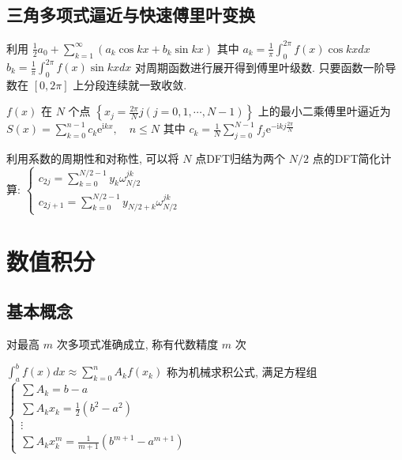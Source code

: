 \documentclass[10pt]{yerbaformat}
\begin{document}
\subsection{三角多项式逼近与快速傅里叶变换}
\par 利用 $\frac{1}{2} a_{0}+\sum_{k=1}^{\infty}\left(a_{k} \cos k x+b_{k} \sin k x\right)$ 其中 $a_{k}=\frac{1}{\pi} \int_{0}^{2 \pi} f(x) \cos k x d x$
$b_{k}=\frac{1}{\pi} \int_{0}^{2 \pi} f(x) \sin k x d x$ 对周期函数进行展开得到傅里叶级数. 只要函数一阶导数在 $[0,2\pi]$ 上分段连续就一致收敛.

\par $f(x)$ 在 $N$ 个点 $\left\{x_{j}=\frac{2 \pi}{N} j(j=0,1, \cdots, N-1)\right\}$ 上的最小二乘傅里叶逼近为 $S(x)=\sum_{k=0}^{n-1} c_{k} \mathrm{e}^{\mathrm{i} k x}, \quad n \leq N$ 其中 $c_{k}=\frac{1}{N} \sum_{j=0}^{N-1} f_{j} \mathrm{e}^{-\mathrm{i} k j \frac{2 \pi}{N}}$

\par 利用系数的周期性和对称性, 可以将 $N$ 点DFT归结为两个 $N/2$ 点的DFT简化计算: $\left\{\begin{array}{l}c_{2 j}=\sum_{k=0}^{N / 2-1} y_{k} \omega_{N / 2}^{j k} \\ c_{2 j+1}=\sum_{k=0}^{N / 2-1} y_{N / 2+k} \omega_{N / 2}^{j k}\end{array}\right.$

\section{数值积分}

\subsection{基本概念}
\begin{definition}
    对最高 $m$ 次多项式准确成立, 称有代数精度 $m$ 次
\end{definition}

\begin{definition}[机械求积公式]
    $\int_{a}^{b} f(x) d x \approx \sum_{k=0}^{n} A_{k} f\left(x_{k}\right)$ 称为机械求积公式, 满足方程组 $\left\{\begin{array}{c}\sum A_{k}=b-a \\ \sum A_{k} x_{k}=\frac{1}{2}\left(b^{2}-a^{2}\right) \\ \vdots \\ \sum A_{k} x_{k}^{m}=\frac{1}{m+1}\left(b^{m+1}-a^{m+1}\right)\end{array}\right.$
\end{definition}
\end{document}

